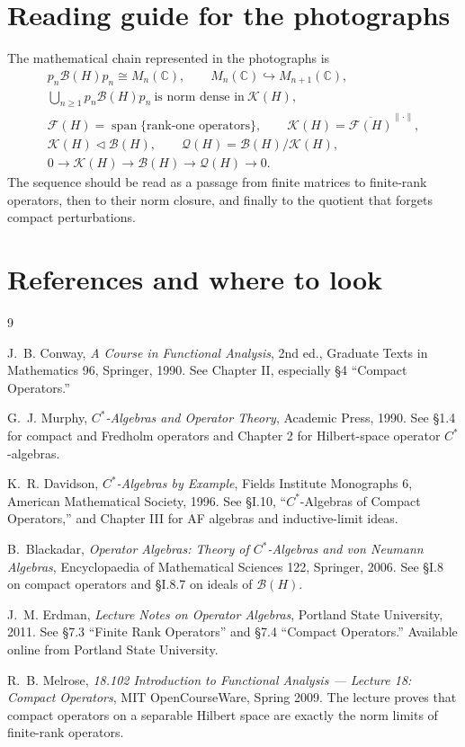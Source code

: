 \documentclass[11pt]{article}
\newcommand{\C}{\mathbb{C}}
\newcommand{\BH}{\mathcal{B}(H)}
\newcommand{\FH}{\mathcal{F}(H)}
\newcommand{\KH}{\mathcal{K}(H)}
\newcommand{\QH}{\mathcal{Q}(H)}
\newcommand{\spann}{\operatorname{span}}
\begin{document}
\section*{Reading guide for the photographs}

The mathematical chain represented in the photographs is
\[
\boxed{
\begin{gathered}
 p_n\BH p_n\cong M_n(\C),
 \qquad
 M_n(\C)\hookrightarrow M_{n+1}(\C),\\[2mm]
 \bigcup_{n\ge1}p_n\BH p_n
 \ \text{is norm dense in}\ \KH,\\[2mm]
 \FH
 =\spann\{\text{rank-one operators}\},
 \qquad
 \KH=\overline{\FH}^{\|\cdot\|},\\[2mm]
 \KH\triangleleft\BH,
 \qquad
 \QH=\BH/\KH,\\[2mm]
 0\longrightarrow\KH\longrightarrow\BH
 \longrightarrow\QH\longrightarrow0.
\end{gathered}
}
\]
The sequence should be read as a passage from finite matrices to finite-rank
operators, then to their norm closure, and finally to the quotient that forgets compact
perturbations.

\section*{References and where to look}

\begin{thebibliography}{9}

J.~B. Conway,
\emph{A Course in Functional Analysis}, 2nd ed.,
Graduate Texts in Mathematics 96, Springer, 1990.
See Chapter II, especially \S4 ``Compact Operators.''

G.~J. Murphy,
\emph{$C^*$-Algebras and Operator Theory},
Academic Press, 1990.
See \S1.4 for compact and Fredholm operators and Chapter 2 for Hilbert-space
operator $C^*$-algebras.

K.~R. Davidson,
\emph{$C^*$-Algebras by Example},
Fields Institute Monographs 6, American Mathematical Society, 1996.
See \S I.10, ``$C^*$-Algebras of Compact Operators,'' and Chapter III for AF
algebras and inductive-limit ideas.

B.~Blackadar,
\emph{Operator Algebras: Theory of $C^*$-Algebras and von Neumann Algebras},
Encyclopaedia of Mathematical Sciences 122, Springer, 2006.
See \S I.8 on compact operators and \S I.8.7 on ideals of $\mathcal B(H)$.

J.~M. Erdman,
\emph{Lecture Notes on Operator Algebras},
Portland State University, 2011.
See \S7.3 ``Finite Rank Operators'' and \S7.4 ``Compact Operators.''
Available online from Portland State University.

R.~B. Melrose,
\emph{18.102 Introduction to Functional Analysis --- Lecture 18: Compact Operators},
MIT OpenCourseWare, Spring 2009.
The lecture proves that compact operators on a separable Hilbert space are exactly
the norm limits of finite-rank operators.

\end{thebibliography}
\end{document}
